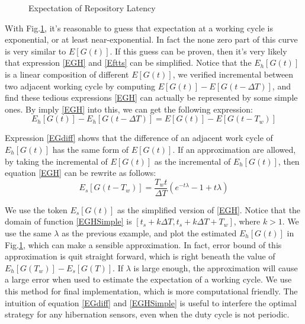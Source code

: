 \documentclass[conference]{IEEEtran}
\begin{document}
\begin{figure}
\centering

\captionsetup{justification=centering}
\caption{Expectation of Repository Latency}
\label{fig:expectation}
\end{figure}


With Fig.\ref{fig:expectation}, it's reasonable to guess that expectation at a working cycle is exponential, or at least near-exponential. In fact the none zero part of this curve is very similar to $E[G(t)]$.
If this guess can be proven, then it's very likely that expression \eqref{EGH} and \eqref{Eftts} can be simplified. Notice that the \(E_h[G(t)]\) is a linear composition of different \(E[G(t)]\), we verified incremental between two adjacent working cycle by computing  $E[G(t)]-E[G(t-\Delta T)] $, and find these tedious expressions \eqref{EGH} can actually be represented by some simple ones. By imply \eqref{EGH} into this, we can get the following expression:
\begin{equation}
E_h[G(t)]-E_h[G(t-\Delta T)]=E[G(t)]-E[G(t-T_w)]\label{EGdiff}
\end{equation}


Expression \eqref{EGdiff} shows that the difference of an adjacent work cycle of $E_h[G(t)]$ has the same form of $E[G(t)]$. If an approximation are allowed, by taking the incremental of $E[G(t)]$ as the incremental of $E_h[G(t)]$, then equation \eqref{EGH} can be rewrite as follows:
\begin{equation}
E_s[G(t-T_w)]=\frac{T_w t}{\Delta T}(e^{-t\lambda}-1+t\lambda)\label{EGHSimple}
\end{equation}


We use the token $E_s[G(t)]$ as the simplified version of \eqref{EGH}. Notice that the domain of function \eqref{EGHSimple} is $[t_s+k\Delta T, t_s+k\Delta T+T_w]$, where $k>1$. 
We use the same $\lambda$ as the previous example, and plot the estimated $E_h[G(t)]$ in Fig.\ref{fig:expectation}, which can make a sensible approximation. In fact, error bound of this approximation is quit straight forward, which is right beneath the value of $E_h[G(T_w)]-E_s[G(T)]$. If $\lambda$ is large enough, the approximation will cause a large error when used to estimate the expectation of a working cycle.
We use this method for final implementation, which is more computational friendly. 
The intuition of equation \eqref{EGdiff}  and \eqref{EGHSimple} is useful to interfere the optimal strategy for any hibernation sensors, even when the duty cycle is not periodic.
\end{document}
